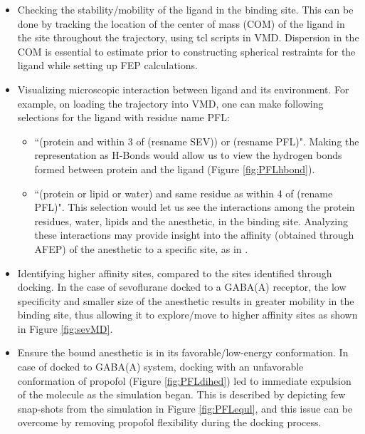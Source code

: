 \documentclass[12pt]{article}
\begin{document}
	\begin{itemize}
		\item Checking the stability/mobility of the ligand in the binding site. This can be done by tracking the location of the center of mass (COM) of the ligand in the site throughout the trajectory, using tcl scripts in VMD. Dispersion in the COM is essential to estimate prior to constructing spherical restraints for the ligand while setting up FEP calculations.
		\item Visualizing microscopic interaction between ligand and its environment. For example, on loading the trajectory into VMD, one can make following selections for the ligand with residue name PFL:
			\begin{itemize}
				\item ``(protein and within 3 of (resname SEV)) or (resname PFL)". Making the representation as H-Bonds would allow us to view the hydrogen bonds formed between protein and the ligand (Figure \ref{fig:PFLhbond}).
				\item ``(protein or lipid or water) and same residue as within 4 of (rename PFL)". This selection would let us see the interactions among the protein residues, water, lipids and the anesthetic, in the binding site.
		Analyzing these interactions may provide insight into the affinity (obtained through AFEP) of the anesthetic to a specific site, as in \cite{Woll2016}.  
			 \end{itemize}
		\item Identifying higher affinity sites, compared to the sites identified through docking. In the case of sevoflurane docked to a GABA(A) receptor, the low specificity and smaller size of the anesthetic results in greater mobility in the binding site, thus allowing it to explore/move to higher affinity sites as shown in Figure \ref{fig:sevMD}.
		\item Ensure the bound anesthetic is in its favorable/low-energy conformation.  In case of  docked to GABA(A) system, docking with an unfavorable conformation of propofol (Figure \ref{fig:PFLdihed}) led to immediate expulsion of the molecule as the simulation began. This is described by depicting few snap-shots from the simulation in Figure \ref{fig:PFLequl}, and this issue can be overcome by removing propofol flexibility during the docking process. %
	 \end{itemize}
	
\end{document}
